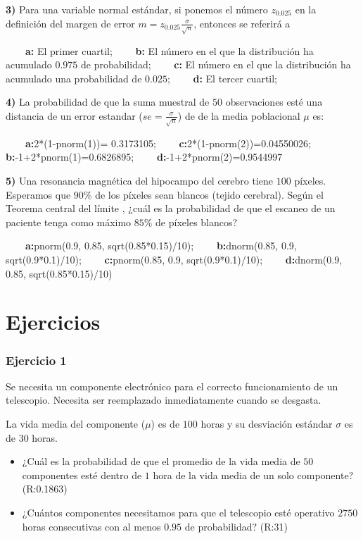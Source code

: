 \documentclass[
]{book}
\begin{document}
\textbf{3)} Para una variable normal estándar, si ponemos el número \(z_{0.025}\) en la definición del margen de error \(m=z_{0.025} \frac{\sigma}{\sqrt{n}}\), entonces se referirá a

\textbf{\(\qquad\)a:} El primer cuartil; \textbf{\(\qquad\)b:} El número en el que la distribución ha acumulado \(0.975\) de probabilidad; \textbf{\(\qquad\)c:} El número en el que la distribución ha acumulado una probabilidad de \(0.025\); \textbf{\(\qquad\)d:} El tercer cuartil;

\textbf{4)} La probabilidad de que la suma muestral de \(50\) observaciones esté una distancia de un error estandar (\(se=\frac{\sigma}{\sqrt{n}}\)) de de la media poblacional \(\mu\) es:

\textbf{\(\qquad\)a:}2*(1-pnorm(1))= 0.3173105; \textbf{\(\qquad\)c:}2*(1-pnorm(2))=0.04550026;
\textbf{\(\qquad\)b:}-1+2*pnorm(1)=0.6826895;
\textbf{\(\qquad\)d:}-1+2*pnorm(2)=0.9544997

\textbf{5)} Una resonancia magnética del hipocampo del cerebro tiene \(100\) píxeles. Esperamos que \(90\%\) de los píxeles sean blancos (tejido cerebral). Según el Teorema central del límite , ¿cuál es la probabilidad de que el escaneo de un paciente tenga como máximo \(85\%\) de píxeles blancos?

\textbf{\(\qquad\)a:}pnorm(0.9, 0.85, sqrt(0.85*0.15)/10); \textbf{\(\qquad\)b:}dnorm(0.85, 0.9,
sqrt(0.9*0.1)/10); \textbf{\(\qquad\)c:}pnorm(0.85, 0.9, sqrt(0.9*0.1)/10); \textbf{\(\qquad\)d:}dnorm(0.9, 0.85, sqrt(0.85*0.15)/10)

\hypertarget{ejercicios-9}{%
\section{Ejercicios}\label{ejercicios-9}}

\hypertarget{ejercicio-1-8}{%
\subsubsection{Ejercicio 1}\label{ejercicio-1-8}}

Se necesita un componente electrónico para el correcto funcionamiento de un telescopio. Necesita ser reemplazado inmediatamente cuando se desgasta.

La vida media del componente (\(\mu\)) es de \(100\) horas y su desviación estándar \(\sigma\) es de \(30\) horas.

\begin{itemize}
\item
  ¿Cuál es la probabilidad de que el promedio de la vida media de \(50\) componentes esté dentro de \(1\) hora de la vida media de un solo componente? (R:0.1863)
\item
  ¿Cuántos componentes necesitamos para que el telescopio esté operativo \(2750\) horas consecutivas con al menos \(0.95\) de probabilidad? (R:31)
\end{itemize}
\end{document}
